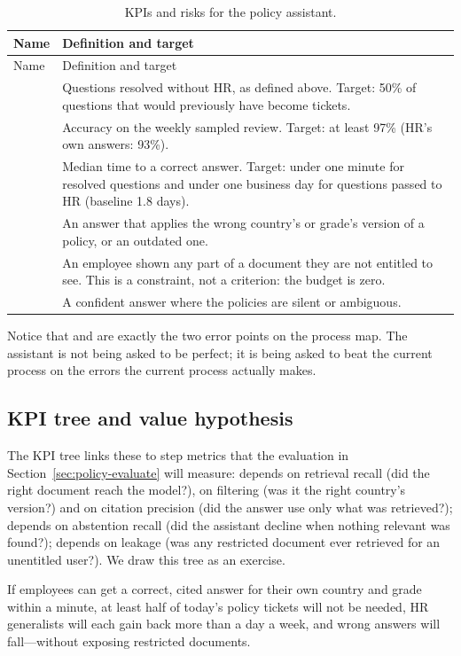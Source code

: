 \begingroup
\small
\begin{xltabular}{\textwidth}{@{}>{\raggedright\arraybackslash}p{3.7cm}>{\raggedright\arraybackslash}X@{}}
\caption{KPIs and risks for the policy assistant.}\label{tab:policy-kpis}\\
\toprule
{} Name & Definition and target \\
\midrule
\endfirsthead
\toprule
{} Name & Definition and target \\
\midrule
\endhead
{} & Questions resolved without HR, as defined above. Target: 50\% of questions that would previously have become tickets. \\
 & Accuracy on the weekly sampled review. Target: at least 97\% (HR's own answers: 93\%). \\
 & Median time to a correct answer. Target: under one minute for resolved questions and under one business day for questions passed to HR (baseline 1.8 days). \\
 & An answer that applies the wrong country's or grade's version of a policy, or an outdated one. \\
 & An employee shown any part of a document they are not entitled to see. This is a constraint, not a criterion: the budget is zero. \\
 & A confident answer where the policies are silent or ambiguous. \\
\bottomrule
\end{xltabular}
\endgroup

Notice that  and  are exactly the two error points on the process map. The assistant is not being asked to be perfect; it is being asked to beat the current process on the errors the current process actually makes.

\subsection{KPI tree and value hypothesis}

The KPI tree links these to step metrics that the evaluation in Section~\ref{sec:policy-evaluate} will measure:  depends on retrieval recall (did the right document reach the model?), on filtering (was it the right country's version?) and on citation precision (did the answer use only what was retrieved?);  depends on abstention recall (did the assistant decline when nothing relevant was found?);  depends on leakage (was any restricted document ever retrieved for an unentitled user?). We draw this tree as an exercise.

\begin{keyidea}
If employees can get a correct, cited answer for their own country and grade within a minute, at least half of today's policy tickets will not be needed, HR generalists will each gain back more than a day a week, and wrong answers will fall---without exposing restricted documents.
\end{keyidea}
